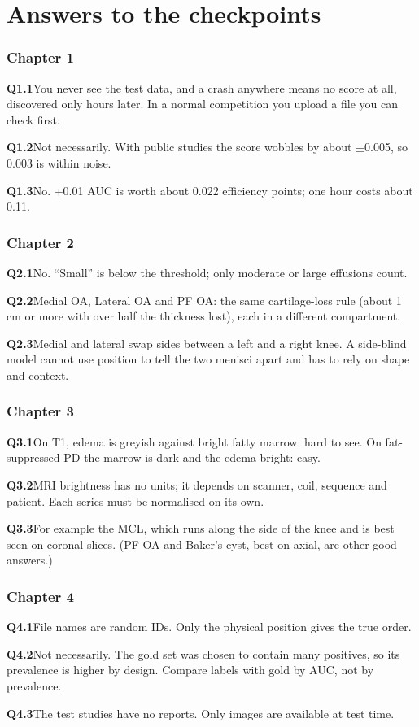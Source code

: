 \chapter{Answers to the checkpoints}
\label{app:answers}

\small
\newcommand{\ans}[2]{\par\textbf{#1}\quad #2\par}
\setlength{\parskip}{0.45em}

\subsection*{Chapter 1}
\ans{Q1.1}{You never see the test data, and a crash anywhere means no score at all, discovered only hours later. In a
normal competition you upload a file you can check first.}
\ans{Q1.2}{Not necessarily. With  public studies the score wobbles by about $\pm$0.005, so 0.003 is within noise.}
\ans{Q1.3}{No. +0.01 AUC is worth about 0.022 efficiency points; one hour costs about 0.11.}

\subsection*{Chapter 2}
\ans{Q2.1}{No. ``Small'' is below the threshold; only moderate or large effusions count.}
\ans{Q2.2}{Medial OA, Lateral OA and PF OA: the same cartilage-loss rule (about 1\,cm or more with over half the thickness
lost), each in a different compartment.}
\ans{Q2.3}{Medial and lateral swap sides between a left and a right knee. A side-blind model cannot use position to tell
the two menisci apart and has to rely on shape and context.}

\subsection*{Chapter 3}
\ans{Q3.1}{On T1, edema is greyish against bright fatty marrow: hard to see. On fat-suppressed PD the marrow is dark and
the edema bright: easy.}
\ans{Q3.2}{MRI brightness has no units; it depends on scanner, coil, sequence and patient. Each series must be
normalised on its own.}
\ans{Q3.3}{For example the MCL, which runs along the side of the knee and is best seen on coronal slices. (PF OA and
Baker's cyst, best on axial, are other good answers.)}

\subsection*{Chapter 4}
\ans{Q4.1}{File names are random IDs. Only the physical position gives the true order.}
\ans{Q4.2}{Not necessarily. The gold set was chosen to contain many positives, so its prevalence is higher by design.
Compare labels with gold by AUC, not by prevalence.}
\ans{Q4.3}{The test studies have no reports. Only images are available at test time.}

